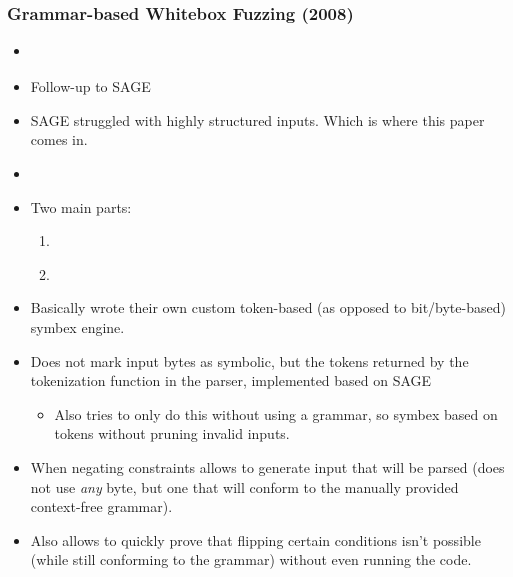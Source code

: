 \documentclass{article}
\begin{document}
\subsubsection{Grammar-based Whitebox Fuzzing (2008)}
\begin{itemize}
    \item \cite{GrammarBasedWhiteboxFuzzing}
    \item Follow-up to SAGE\cite{SAGE}
    \item SAGE struggled with highly structured inputs. Which is where this paper comes in.
    \item {}\cite{GrammarBasedWhiteboxFuzzing}
    \item Two main parts:
          \begin{enumerate}
              \item {}\cite{GrammarBasedWhiteboxFuzzing}
              \item {}\cite{GrammarBasedWhiteboxFuzzing}
          \end{enumerate}
    \item Basically wrote their own custom token-based (as opposed to bit/byte-based) symbex engine.
    \item Does not mark input bytes as symbolic, but the tokens returned by the tokenization function in the parser, implemented based on SAGE\cite{SAGE}
          \begin{itemize}
              \item Also tries to only do this without using a grammar, so symbex based on tokens without pruning invalid inputs.
          \end{itemize}
    \item When negating constraints allows to generate input that will be parsed (does not use \textit{any} byte, but one that will conform to the manually provided context-free grammar).
    \item Also allows to quickly prove that flipping certain conditions isn't possible (while still conforming to the grammar) without even running the code.

\end{itemize}
\end{document}
